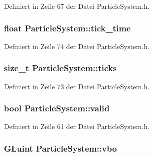Definiert in Zeile 67 der Datei Particle\-System.\-h.

\hypertarget{classParticleSystem_a74f4d4516a33478923b79766c54cbb13}{
\subsubsection[{tick\-\_\-time}]{\setlength{\rightskip}{0pt plus 5cm}float Particle\-System\-::tick\-\_\-time\hspace{0.3cm}{\ttfamily [private]}}}\label{classParticleSystem_a74f4d4516a33478923b79766c54cbb13}


Definiert in Zeile 74 der Datei Particle\-System.\-h.

\hypertarget{classParticleSystem_a32d3efc1966cace76ec11e581716777b}{
\subsubsection[{ticks}]{\setlength{\rightskip}{0pt plus 5cm}size\-\_\-t Particle\-System\-::ticks\hspace{0.3cm}{\ttfamily [private]}}}\label{classParticleSystem_a32d3efc1966cace76ec11e581716777b}


Definiert in Zeile 73 der Datei Particle\-System.\-h.

\hypertarget{classParticleSystem_a6541039a541fddd38220c8bde2b4f4ac}{
\subsubsection[{valid}]{\setlength{\rightskip}{0pt plus 5cm}bool Particle\-System\-::valid\hspace{0.3cm}{\ttfamily [private]}}}\label{classParticleSystem_a6541039a541fddd38220c8bde2b4f4ac}


Definiert in Zeile 61 der Datei Particle\-System.\-h.

\hypertarget{classParticleSystem_afde2a8d8d82c9c569de9424610bd3da6}{
\subsubsection[{vbo}]{\setlength{\rightskip}{0pt plus 5cm}G\-Luint Particle\-System\-::vbo}}\label{classParticleSystem_afde2a8d8d82c9c569de9424610bd3da6}


